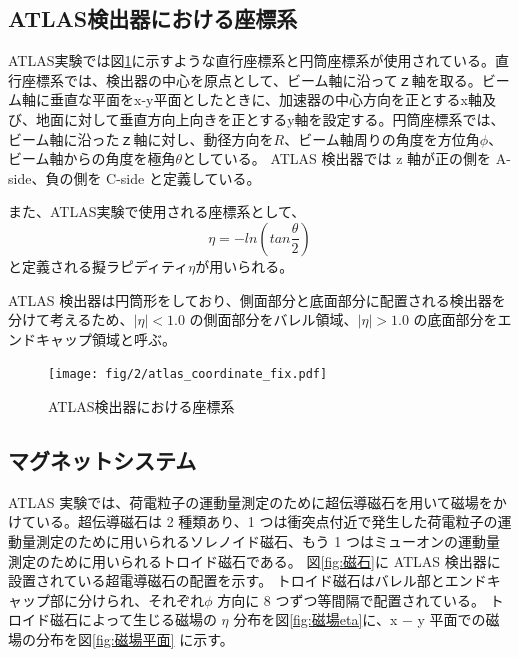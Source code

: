 \subsection{ATLAS検出器における座標系}
ATLAS実験では図\ref{fig:a}に示すような直行座標系と円筒座標系が使用されている。直行座標系では、検出器の中心を原点として、ビーム軸に沿ってｚ軸を取る。ビーム軸に垂直な平面をx-y平面としたときに、加速器の中心方向を正とするx軸及び、地面に対して垂直方向上向きを正とするy軸を設定する。円筒座標系では、ビーム軸に沿ったｚ軸に対し、動径方向を$R$、ビーム軸周りの角度を方位角$\phi$、ビーム軸からの角度を極角$\theta$としている。
ATLAS 検出器では z 軸が正の側を A-side、負の側を C-side と定義している。

また、ATLAS実験で使用される座標系として、
\begin{equation}
　\eta=-ln(tan\frac{\theta}{2})
　\label{ラピディティ}
\end{equation}
と定義される擬ラピディティ$\eta$が用いられる。

ATLAS 検出器は円筒形をしており、側面部分と底面部分に配置される検出器を分けて考えるため、$|\eta| < 1.0$ の側面部分をバレル領域、$|\eta| > 1.0$ の底面部分をエンドキャップ領域と呼ぶ。

\begin{figure}[tb]
  \centering
  \texttt{[image: fig/2/atlas\_coordinate\_fix.pdf]}
  \caption{ATLAS検出器における座標系}
  \label{fig:a}
\end{figure}

\subsection{マグネットシステム}
ATLAS 実験では、荷電粒子の運動量測定のために超伝導磁石を用いて磁場をかけている。超伝導磁石は 2 種類あり、1 つは衝突点付近で発生した荷電粒子の運動量測定のために用いられるソレノイド磁石、もう 1 つはミューオンの運動量測定のために用いられるトロイド磁石である。
図\ref{fig:磁石}に ATLAS 検出器に設置されている超電導磁石の配置を示す。
トロイド磁石はバレル部とエンドキャップ部に分けられ、それぞれ$\phi$ 方向に 8 つずつ等間隔で配置されている。
トロイド磁石によって生じる磁場の $\eta$ 分布を図\ref{fig:磁場eta}に、x − y 平面での磁場の分布を図\ref{fig:磁場平面} に示す。


